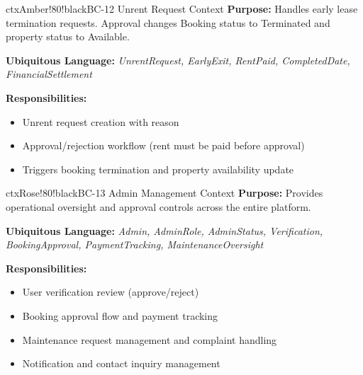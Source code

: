 \documentclass[12pt,a4paper]{article}
\begin{document}
\vspace{0.5em}

\begin{contextbox}{ctxAmber!80!black}{BC-12 \quad Unrent Request Context}
\textbf{Purpose:} Handles early lease termination requests. Approval changes Booking status to Terminated and property status to Available.

\textbf{Ubiquitous Language:} \textit{UnrentRequest, EarlyExit, RentPaid, CompletedDate, FinancialSettlement}

\textbf{Responsibilities:}
\begin{itemize}
  \item Unrent request creation with reason
  \item Approval/rejection workflow (rent must be paid before approval)
  \item Triggers booking termination and property availability update
\end{itemize}
\end{contextbox}


\vspace{0.5em}

\begin{contextbox}{ctxRose!80!black}{BC-13 \quad Admin Management Context}
\textbf{Purpose:} Provides operational oversight and approval controls across the entire platform.

\textbf{Ubiquitous Language:} \textit{Admin, AdminRole, AdminStatus, Verification, BookingApproval, PaymentTracking, MaintenanceOversight}

\textbf{Responsibilities:}
\begin{itemize}
  \item User verification review (approve/reject)
  \item Booking approval flow and payment tracking
  \item Maintenance request management and complaint handling
  \item Notification and contact inquiry management
\end{itemize}
\end{contextbox}

\vspace{0.5em}
\end{document}

